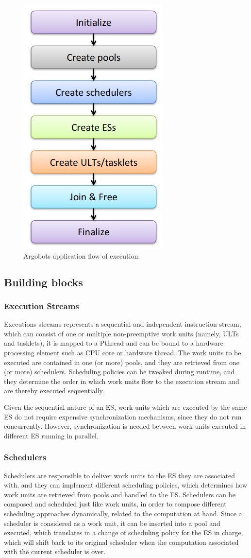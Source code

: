 \begin{figure}[H]
    \centering
    \includegraphics[width=0.35\linewidth]{res/control-flow.png}
    \caption{Argobots application flow of execution.}
    \label{fig:ex-flow}
\end{figure}

\subsection{Building blocks}
\subsubsection{Execution Streams}
Executions streams represents a sequential and independent instruction stream, which can consist of one or multiple non-preemptive work units (namely, ULTs and tasklets), it is mapped to a Pthread and can be bound to a hardware processing element such as CPU core or hardware thread. The work units to be executed are contained in one (or more) pools, and they are retrieved from one (or more) schedulers. Scheduling policies can be tweaked during runtime, and they determine the order in which work units flow to the execution stream and are thereby executed sequentially.\newline

Given the sequential nature of an ES, work units which are executed by the same ES do not require expensive synchronization mechanisms, since they do not run concurrently. However, synchronization is needed between work units executed in different ES running in parallel. 

\subsubsection{Schedulers}
Schedulers are responsible to deliver work units to the ES they are associated with, and they can implement different scheduling policies, which determines how work units are retrieved from pools and handled to the ES. Schedulers can be composed and scheduled just like work units, in order to compose different scheduling approaches dynamically, related to the computation at hand. Since a scheduler is considered as a work unit, it can be inserted into a pool and executed, which translates in a change of scheduling policy for the ES in charge, which will shift back to its original scheduler when the computation associated with the current scheduler is over.

